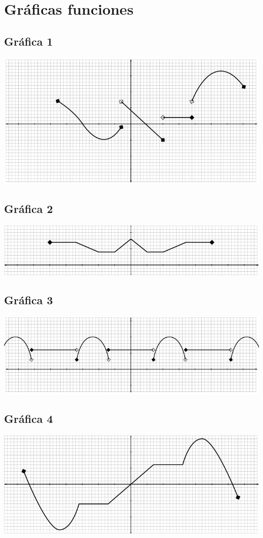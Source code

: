 
\chapter{Gráficas funciones}
\onecolumn

\section{Gráfica 1}

\includegraphics{../img/graficas-funciones-1.png}

\section{Gráfica 2}
\includegraphics{../img/graficas-funciones-2.png}

\section{Gráfica 3}
\includegraphics{../img/graficas-funciones-3.png}

\section{Gráfica 4}
\includegraphics{../img/graficas-funciones-4.png}

